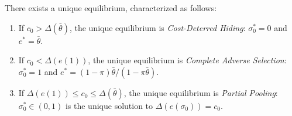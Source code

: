 \label{prop:equilibrium}
There exists a unique equilibrium, characterized as follows:
\begin{enumerate}[label=(\roman*)]
    \item If $c_0>\Delta(\bar{\theta})$, the unique equilibrium is \emph{Cost-Deterred Hiding}: $\sigma_0^*=0$ and $e^*=\bar{\theta}$.
    \item If $c_0<\Delta(e(1))$, the unique equilibrium is \emph{Complete Adverse Selection}: $\sigma_0^*=1$ and $e^*=(1-\pi)\bar{\theta}/(1-\pi\bar{\theta})$.
    \item If $\Delta(e(1))\leq c_0\leq\Delta(\bar{\theta})$, the unique equilibrium is \emph{Partial Pooling}: $\sigma_0^*\in(0,1)$ is the unique solution to $\Delta(e(\sigma_0))=c_0$.
\end{enumerate}
